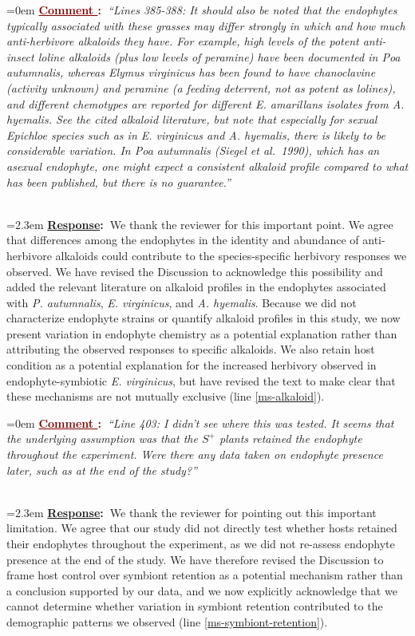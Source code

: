 \documentclass[12pt]{article}
\newcounter{cN}
\newcommand{\comment}[1]{
	\vspace{2em}
	\refstepcounter{cN} %
	\noindent \hangindent=0em \textbf{\textcolor{Maroon}{\uline{Comment \thecN}:~}}\emph{``#1''}
	}
\newcommand{\response}[1]{
	\\[0.25em]
	\hangindent=2.3em \textbf{\textcolor{NavyBlue}{\uline{Response}:~}}#1
	}
\providecommand{\uline}[1]{\underline{#1}}
\begin{document}
\comment{Lines 385-388: It should also be noted that the endophytes typically associated with these grasses may differ strongly in which and how much anti-herbivore alkaloids they have. For example, high levels of the potent anti-insect loline alkaloids (plus low levels of peramine) have been documented in \textit{Poa autumnalis}, whereas \textit{Elymus virginicus} has been found to have chanoclavine (activity unknown) and peramine (a feeding deterrent, not as potent as lolines), and different chemotypes are reported for different \textit{E. amarillans} isolates from \textit{A. hyemalis}. See the cited alkaloid literature, but note that especially for sexual \textit{Epichloe} species such as in \textit{E. virginicus} and \textit{A. hyemalis}, there is likely to be considerable variation. In \textit{Poa autumnalis} (Siegel et al.\ 1990), which has an asexual endophyte, one might expect a consistent alkaloid profile compared to what has been published, but there is no guarantee.}
\response{We thank the reviewer for this important point. We agree that differences among the endophytes in the identity and abundance of anti-herbivore alkaloids could contribute to the species-specific herbivory responses we observed. We have revised the Discussion to acknowledge this possibility and added the relevant literature on alkaloid profiles in the endophytes associated with \textit{P. autumnalis}, \textit{E. virginicus}, and \textit{A. hyemalis}. Because we did not characterize endophyte strains or quantify alkaloid profiles in this study, we now present variation in endophyte chemistry as a potential explanation rather than attributing the observed responses to specific alkaloids. We also retain host condition as a potential explanation for the increased herbivory observed in endophyte-symbiotic \textit{E. virginicus}, but have revised the text to make clear that these mechanisms are not mutually exclusive (line \ref{ms-alkaloid}).}

\comment{Line 403: I didn't see where this was tested. It seems that the underlying assumption was that the $S^+$ plants retained the endophyte throughout the experiment. Were there any data taken on endophyte presence later, such as at the end of the study?}
\response{We thank the reviewer for pointing out this important limitation. We agree that our study did not directly test whether hosts retained their endophytes throughout the experiment, as we did not re-assess endophyte presence at the end of the study. We have therefore revised the Discussion to frame host control over symbiont retention as a potential mechanism rather than a conclusion supported by our data, and we now explicitly acknowledge that we cannot determine whether variation in symbiont retention contributed to the demographic patterns we observed (line \ref{ms-symbiont-retention}).
}
\end{document}
